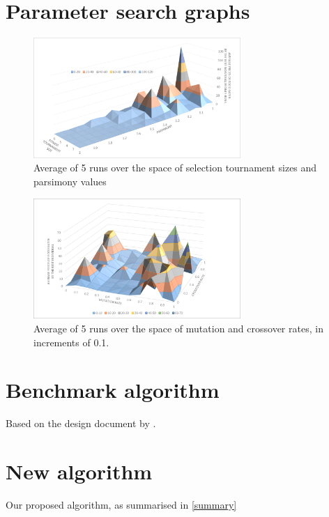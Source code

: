 \documentclass[british,10pt,a4paper]{article}
\begin{document}
\begin{appendices}
	\section{Parameter search graphs}
	\label{app:param_search}
	\begin{figure}[H]
		\centering
		\includegraphics[width=0.7\textwidth,keepaspectratio]{images/fitness_size_parsimony.png}
		\caption{Average of 5 runs over the space of selection tournament sizes and parsimony values}
		\label{fig:fitness_parsimony}
	\end{figure}
	\begin{figure}[H]
		\centering
		\includegraphics[width=0.7\textwidth,keepaspectratio]{images/cxpb_mutpb.png}
		\caption{Average of 5 runs over the space of mutation and crossover rates, in increments of 0.1.}
		\label{fig:mutpb_cxpb}
	\end{figure}
	\clearpage
	\section{Benchmark algorithm}\label{app:approach1}
	Based on the design document by \citet{Ehlis2000-sz}. 
	
  	\clearpage	

	\section{New algorithm}\label{app:approach4}
	Our proposed algorithm, as summarised in \autoref{summary} 
	
  	\clearpage	

\end{appendices}
\clearpage
\end{document}
